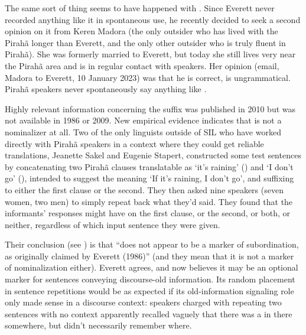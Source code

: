 \documentclass[output=paper,colorlinks,citecolor=brown
]{langscibook}
\begin{document}
The same sort of thing seems to have happened with . Since Everett
never recorded anything like it in spontaneous use, he recently decided
to seek a second opinion on it from Keren Madora (the only outsider who
has lived with the Pirah{\~a} longer than Everett, and the only other
outsider who is truly fluent in Pirah{\~a}). She was formerly married
to Everett, but today she still lives very near the Pirah{\~a} area
and is in regular contact with speakers. Her opinion (email, Madora
to Everett, 10 January 2023) was that he is correct,  is
ungrammatical. Pirah{\~a} speakers never spontaneously say anything
like .

Highly relevant information concerning the suffix \mbox{}
was published in 2010 but was not available in 1986 or 2009. New empirical
evidence indicates that \mbox{} is not a nominalizer at all.
Two of the only linguists outside of SIL who have worked directly
with Pirah{\~a} speakers in a context where they could get reliable
translations, Jeanette Sakel and Eugenie Stapert, constructed some
test sentences by concatenating two Pirah{\~a} clauses translatable
as `it's raining' () and `I don't go' (), intended to suggest the meaning `If it's raining,
I don't go', and suffixing \mbox{} to either the first
clause or the second. They then asked nine speakers (seven women, two
men) to simply repeat back what they'd said. They found that the
informants' responses might have \mbox{} on the first
clause, or the second, or both, or neither, regardless of which input
sentence they were given.

Their conclusion (see \citealt[5--6]{SakeStap10}) is that
\mbox{} ``does not appear to be a marker of subordination,
as originally claimed by Everett (1986)'' (and they mean that it is
not a marker of nominalization either). Everett agrees, and now
believes it may be an optional marker for sentences conveying
discourse-old information. Its random placement in sentence repetitions
would be as expected if its old-information signaling role only made
sense in a discourse context: speakers charged with repeating two
sentences with no context apparently recalled vaguely that there was
a \mbox{} in there somewhere, but didn't necessarily
remember where.
\end{document}
